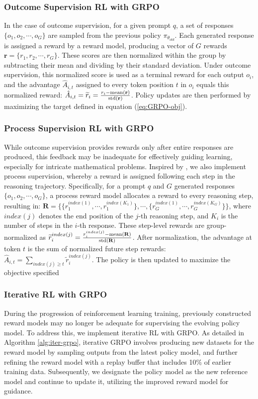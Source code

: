 \begin{itemize}[topsep=0pt]
\subsubsection{Outcome Supervision RL with GRPO} In the case of outcome supervision, for a given prompt $q$, a set of responses $\{o_1, o_2, \cdots, o_G\}$ are sampled from the previous policy $\pi_{\theta_{old}}$. Each generated response is assigned a reward by a reward model, producing a vector of $G$ rewards $\mathbf{r}=\{r_1, r_2, \cdots, r_G\}$. These scores are then normalized within the group by subtracting their mean and dividing by their standard deviation. Under outcome supervision, this normalized score is used as a terminal reward for each output $o_i$, and the advantage $\hat{A}_{i, t}$ assigned to every token position $t$ in $o_i$ equals this normalized reward: $\hat{A}_{i, t} = \widetilde{r}_i = \frac{r_i- {\rm mean}(\mathbf{r})}{{\rm std}(\mathbf{r})}$. Policy updates are then performed by maximizing the target defined in equation (\ref{eq:GRPO-obj}).

\subsubsection{Process Supervision RL with GRPO} While outcome supervision provides rewards only after entire responses are produced, this feedback may be inadequate for effectively guiding learning, especially for intricate mathematical problems. Inspired by \cite{wang2023math}, we also implement process supervision, whereby a reward is assigned following each step in the reasoning trajectory. Specifically, for a prompt $q$ and $G$ generated responses $\{o_1, o_2, \cdots, o_G\}$, a process reward model allocates a reward to every reasoning step, resulting in: $\mathbf{R} = \{ \{r_1^{index(1)},\cdots,r_1^{index(K_1)}\}, \cdots,  \{r_G^{index(1)},\cdots,r_G^{index(K_G)}\} \}$, where $index(j)$ denotes the end position of the $j$-th reasoning step, and $K_i$ is the number of steps in the $i$-th response. These step-level rewards are group-normalized as $\widetilde{r}_i^{index(j)} = \frac{r_i^{index(j)} - {\rm mean(\mathbf{R})}}{{\rm std(\mathbf{R})}}$.
After normalization, the advantage at token $t$ is the sum of normalized future step rewards: $\hat{A}_{i, t} = \sum_{index(j) \ge t} \widetilde{r}_i^{index(j)}$.
The policy is then updated to maximize the objective specified

\subsubsection{Iterative RL with GRPO} During the progression of reinforcement learning training, previously constructed reward models may no longer be adequate for supervising the evolving policy model. To address this, we implement iterative RL with GRPO. As detailed in Algorithm \ref{alg:iter-grpo}, iterative GRPO involves producing new datasets for the reward model by sampling outputs from the latest policy model, and further refining the reward model with a replay buffer that includes 10\% of earlier training data. Subsequently, we designate the policy model as the new reference model and continue to update it, utilizing the improved reward model for guidance.


\end{itemize}
